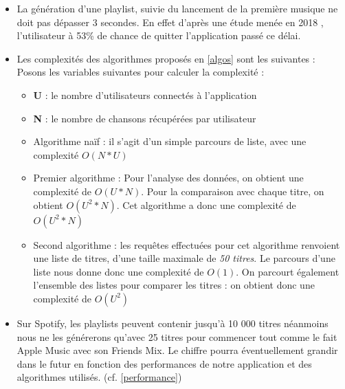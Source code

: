 \documentclass{article}
\begin{document}
		\begin{itemize}
			\item La génération d'une playlist, suivie du lancement de la première musique ne doit pas dépasser 3 secondes. En effet d'après une étude menée en 2018 \cite{MobileSpeedGoogle2018}, l'utilisateur à 53\% de chance de quitter l'application passé ce délai.
			      			
			\item Les complexités des algorithmes proposés en \ref{algos} sont les suivantes : \newline
			      Posons les variables suivantes pour calculer la complexité : 
			      \begin{itemize}
			      	\item[] \textbf{U} : le nombre d'utilisateurs connectés à l'application
			      	\item[] \textbf{N} : le nombre de chansons récupérées par utilisateur
			      \end{itemize}
			      \begin{itemize}
			      	\item Algorithme naïf : il s'agit d'un simple parcours de liste, avec une complexité \textbf{$O(N*U)$}
			      	\item Premier algorithme : Pour l'analyse des données, on obtient une complexité de \textbf{$O(U*N)$}. Pour la comparaison avec chaque titre, on obtient \textbf{$O(U^2*N)$}. Cet algorithme a donc une complexité de \textbf{$O(U^2*N)$}
			      	\item Second algorithme : les requêtes effectuées pour cet algorithme renvoient une liste de titres, d'une taille maximale de \textit{50 titres}. Le parcours d'une liste nous donne donc une complexité de \textbf{$O(1)$}. On parcourt également l'ensemble des listes pour comparer les titres : on obtient donc une complexité de \textbf{$O(U^2)$}
			      	      		
			      \end{itemize}
			\item Sur Spotify, les playlists peuvent contenir jusqu'à 10 000 titres néanmoins nous ne les générerons qu'avec 25 titres pour commencer tout comme le fait Apple Music avec son Friends Mix. Le chiffre pourra éventuellement grandir dans le futur en fonction des performances de notre application et des algorithmes utilisés. (cf. \ref{performance})
		\end{itemize}
\end{document}
